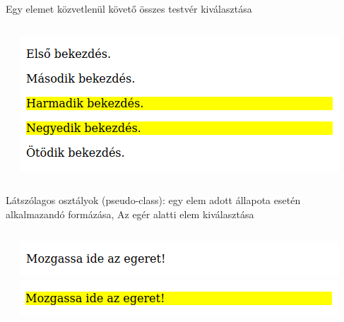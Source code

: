 \begin{frame}
  Egy elemet közvetlenül követő összes testvér kiválasztása
  \begin{columns}[c]
      \begin{exampleblock}{}
        \footnotesize
        
        
      \end{exampleblock}
      \includegraphics[width=\textwidth]{testver2.png}
  \end{columns}
\end{frame}

\begin{frame}
  Látszólagos osztályok (pseudo-class): egy elem adott állapota esetén alkalmazandó formázása, 
  \vfill
  Az egér alatti elem kiválasztása
  \begin{columns}[c]
      \begin{exampleblock}{}
        \footnotesize
        
        
      \end{exampleblock}
      \includegraphics[width=\textwidth]{hover1.png}
      \vfill
      \includegraphics[width=\textwidth]{hover2.png}
  \end{columns}
\end{frame}

